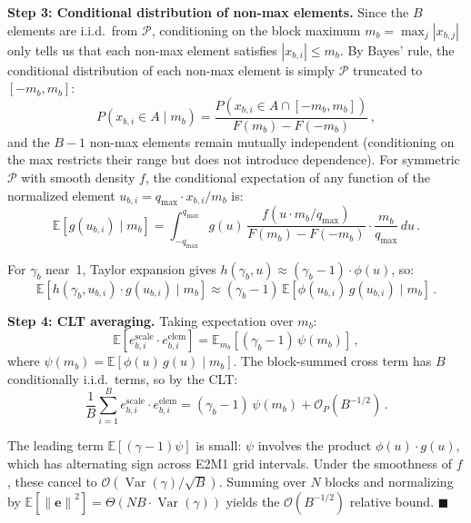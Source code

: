 \documentclass{article}
\theoremstyle{definition}
\theoremstyle{remark}
\DeclareMathOperator{\Var}{Var}
\newcommand{\Expect}{\mathbb{E}}
\newcommand{\cP}{\mathcal{P}}
\newcommand{\be}{\bm{e}}
\newcommand{\norm}[1]{\left\|#1\right\|}
\begin{document}
\textbf{Step 3: Conditional distribution of non-max elements.}\;
Since the $B$ elements are i.i.d.\ from $\cP$, conditioning on the block maximum $m_b = \max_j |x_{b,j}|$ only tells us that each non-max element satisfies $|x_{b,i}| \leq m_b$. By Bayes' rule, the conditional distribution of each non-max element is simply $\cP$ truncated to $[-m_b, m_b]$:
\begin{equation}
  P(x_{b,i} \in A \mid m_b) = \frac{P(x_{b,i} \in A \cap [-m_b, m_b])}{F(m_b) - F(-m_b)}\,,
\end{equation}
and the $B{-}1$ non-max elements remain mutually independent (conditioning on the max restricts their range but does not introduce dependence). For symmetric $\cP$ with smooth density $f$, the conditional expectation of any function of the normalized element $u_{b,i} = q_{\max} \cdot x_{b,i}/m_b$ is:
\begin{equation}
  \Expect[g(u_{b,i}) \mid m_b]
  = \int_{-q_{\max}}^{q_{\max}} g(u)\,
    \frac{f(u \cdot m_b/q_{\max})}{F(m_b) - F(-m_b)}
    \cdot \frac{m_b}{q_{\max}}\, du\,.
\end{equation}

For $\gamma_b$ near~1, Taylor expansion gives $h(\gamma_b, u) \approx (\gamma_b - 1)\cdot\phi(u)$, so:
\begin{equation}
  \Expect[h(\gamma_b, u_{b,i})\cdot g(u_{b,i}) \mid m_b]
  \approx (\gamma_b - 1)\,\Expect[\phi(u_{b,i})\,g(u_{b,i}) \mid m_b]\,.
\end{equation}

\textbf{Step 4: CLT averaging.}\;
Taking expectation over $m_b$:
\begin{equation}
  \Expect[e_{b,i}^{\mathrm{scale}} \cdot e_{b,i}^{\mathrm{elem}}]
  = \Expect_{m_b}[(\gamma_b - 1)\,\psi(m_b)]\,,
\end{equation}
where $\psi(m_b) = \Expect[\phi(u)\,g(u) \mid m_b]$. The block-summed cross term has $B$ conditionally i.i.d.\ terms, so by the CLT:
\begin{equation}
  \frac{1}{B}\sum_{i=1}^B e_{b,i}^{\mathrm{scale}} \cdot e_{b,i}^{\mathrm{elem}}
  = (\gamma_b - 1)\,\psi(m_b) + \mathcal{O}_P(B^{-1/2})\,.
\end{equation}

The leading term $\Expect[(\gamma{-}1)\psi]$ is small: $\psi$ involves the product $\phi(u)\cdot g(u)$, which has alternating sign across E2M1 grid intervals. Under the smoothness of $f$, these cancel to $\mathcal{O}(\Var(\gamma)/\sqrt{B})$. Summing over $N$ blocks and normalizing by $\Expect[\norm{\be}^2] = \Theta(NB\cdot\Var(\gamma))$ yields the $\mathcal{O}(B^{-1/2})$ relative bound. $\blacksquare$
\end{document}
